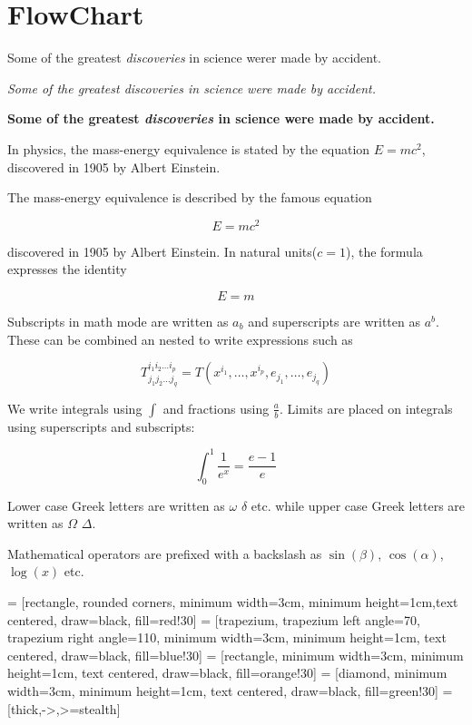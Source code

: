 \chapter{FlowChart}

Some of the greatest \emph{discoveries} in science werer made by accident.

\textit{Some of the greatest \emph{discoveries} in science were made by accident.}

\textbf{Some of the greatest \emph{discoveries} in science were made by accident.}

In physics, the mass-energy equivalence is stated by the equation $E=mc^2$, discovered
in 1905 by Albert Einstein.

The mass-energy equivalence is described by the famous equation 

$$E=mc^2$$

discovered in 1905 by Albert Einstein.
In natural units($c = 1$), the formula expresses the identity

\begin{equation}
E=m
\end{equation}

Subscripts in math mode are written as $a_b$ and superscripts are written as $a^b$. 
These can be combined an nested to write expressions such as

$$T^{i_1 i_2 \dots i_p}_{j_1 j_2 \dots j_q} = T(x^{i_1},\dots,x^{i_p},e_{j_1},\dots,e_{j_q})$$

We write integrals using $\int$ and fractions using $\frac{a}{b}$. 
Limits are placed on integrals using superscripts and subscripts:

$$\int_0^1 \frac{1}{e^x} =  \frac{e-1}{e}$$

Lower case Greek letters are written as $\omega$ $\delta$ etc. 
while upper case Greek letters are written as $\Omega$ $\Delta$.

Mathematical operators are prefixed with a backslash as $\sin(\beta)$, $\cos(\alpha)$, $\log(x)$ etc.

 = [rectangle, rounded corners, minimum width=3cm, minimum height=1cm,text centered, draw=black, fill=red!30]
 = [trapezium, trapezium left angle=70, trapezium right angle=110, minimum width=3cm, minimum height=1cm, text centered, draw=black, fill=blue!30]
 = [rectangle, minimum width=3cm, minimum height=1cm, text centered, draw=black, fill=orange!30]
 = [diamond, minimum width=3cm, minimum height=1cm, text centered, draw=black, fill=green!30]
 = [thick,->,>=stealth]

